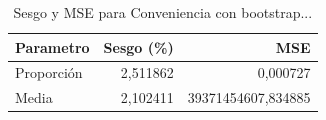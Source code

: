 \begin{table}

\caption{Sesgo y MSE para Conveniencia con bootstrap...}
\centering
\begin{tabular}[t]{lrr}
\toprule
Parametro & Sesgo (\%) & MSE\\
\midrule
Proporción & 2,511862 & 0,000727\\
Media & 2,102411 & 39371454607,834885\\
\bottomrule
\end{tabular}
\end{table}
